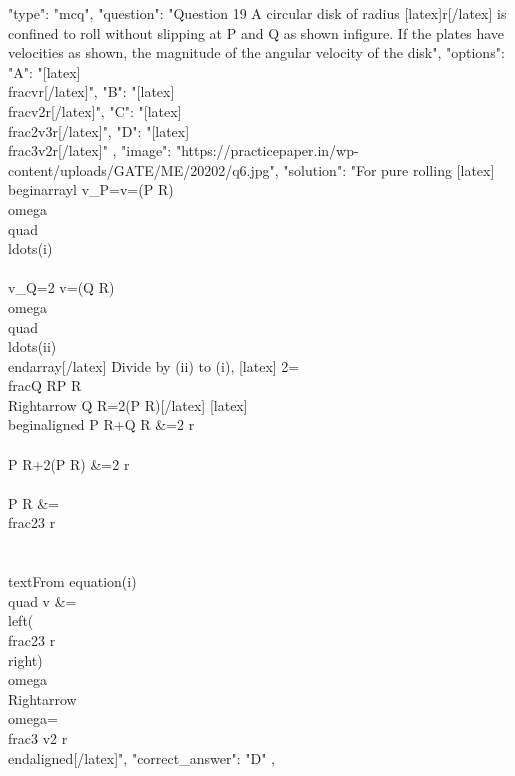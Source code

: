   {
    "type": "mcq",
    "question": "Question 19 A circular disk of radius [latex]r[/latex] is confined to roll without slipping at P and Q as shown in\nthe figure. If the plates have velocities as shown, the magnitude of the angular velocity of the disk\nis",
    "options": {
      "A": "[latex]\\frac{v}{r}[/latex]",
      "B": "[latex]\\frac{v}{2r}[/latex]",
      "C": "[latex]\\frac{2v}{3r}[/latex]",
      "D": "[latex]\\frac{3v}{2r}[/latex]"
    },
    "image": "https://practicepaper.in/wp-content/uploads/GATE/ME/20202/q6.jpg",
    "solution": "For pure rolling [latex] \\begin{array}{l} v_{P}=v=(P R) \\omega \\quad \\ldots(i)\\\\ v_{Q}=2 v=(Q R) \\omega \\quad \\ldots(ii) \\end{array}[/latex] Divide by (ii) to (i), [latex] 2=\\frac{Q R}{P R} \\Rightarrow Q R=2(P R)[/latex] [latex] \\begin{aligned} P R+Q R &=2 r \\\\ P R+2(P R) &=2 r \\\\ P R &=\\frac{2}{3} r \\\\ \\text{From equation(i) }\\quad v &=\\left(\\frac{2}{3} r\\right) \\omega \\Rightarrow \\omega=\\frac{3 v}{2 r} \\end{aligned}[/latex]",
    "correct_answer": "D"
  },
